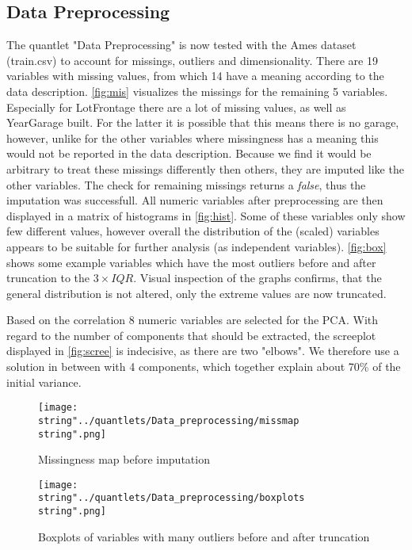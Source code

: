 
\subsection{Data Preprocessing}
The quantlet "Data Preprocessing" is now tested with the Ames dataset (train.csv) to account for missings, outliers and dimensionality. 
There are 19 variables with missing values, from which 14 have a meaning according to the data description. 
\autoref{fig:mis} visualizes the missings for the remaining 5 variables. Especially for LotFrontage there are a lot of missing values, as well as YearGarage built. For the latter it is possible that this means there is no garage, however, unlike for the other variables where missingness has a meaning this would not be reported in the data description. Because we find it would be arbitrary to treat these missings differently then others, they are imputed like the other variables.
The check for remaining missings returns a \textit{false}, thus the imputation was successfull. 
All numeric variables after preprocessing are then displayed in a matrix of  histograms in \autoref{fig:hist}. Some of these variables only show few different values, however overall the distribution of the (scaled) variables appears to be suitable for further analysis (as independent variables). 
\autoref{fig:box} shows some example variables which have the most outliers before and after truncation to the $3 \times IQR$. Visual inspection of the graphs confirms, that the general distribution is not altered, only the extreme values are now truncated. 


Based on the correlation 8 numeric variables are selected for the PCA. With regard to the number of components that should be extracted, the screeplot displayed in \autoref{fig:scree} is indecisive, as there are two "elbows".  We therefore use a solution in between with 4 components, which together explain about 70\% of the initial variance. 



\begin{figure}[H]
  \centering
\texttt{[image: \\string"../quantlets/Data\_preprocessing/missmap\\string".png]}
  \caption{Missingness map before imputation}\label{fig:mis}
\end{figure}
 
\begin{figure}[H]
  \centering
\texttt{[image: \\string"../quantlets/Data\_preprocessing/boxplots\\string".png]}
  \caption{Boxplots of variables with many outliers before and after truncation}\label{fig:box}
\end{figure}

